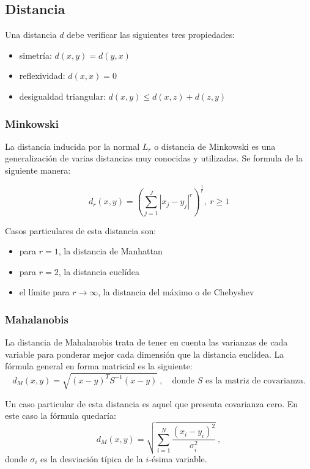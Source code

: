 \documentclass[a4paper,11pt,spanish]{report}
\let\stdsub\subsection
\let\stdsubsub\subsubsection
\renewcommand{\section}{\stdsub}
\renewcommand{\subsection}{\stdsubsub}
\begin{document}
\section{Distancia}
\label{sec-1-2-3}

Una distancia $d$ debe verificar las siguientes tres propiedades:
\begin{itemize}
\item simetría: $d(x,y)=d(y,x)$
\item reflexividad: $d(x,x) = 0$
\item desigualdad triangular: $d(x,y)\leq d(x,z)+d(z,y)$
\end{itemize}

\subsection*{Minkowski}
\label{sec-1-2-3-1}

La distancia inducida por la normal $L_r$ o distancia de Minkowski es una generalización de varias distancias muy conocidas y utilizadas. Se formula de la siguiente manera: 

$$d_r(x,y) = \left(\sum_{j=1}^J |x_j-y_j|^r\right)^{\frac 1 r},~r\geq 1$$

Casos particulares de esta distancia son:
\begin{itemize}
\item para $r=1$, la distancia de Manhattan
\item para $r=2$, la distancia euclídea
\item el límite para $r\rightarrow \infty$, la distancia del máximo o de Chebyshev
\end{itemize}

\subsection*{Mahalanobis}
\label{sec-1-2-3-2}

La distancia de Mahalanobis trata de tener en cuenta las varianzas de cada variable para ponderar mejor cada dimensión que la distancia euclídea. La fórmula general en forma matricial es la siguiente:
$$d_M(x,y)=\sqrt{(x-y)^TS^{-1}(x-y)}~,\quad\mbox{donde }S\mbox{ es la matriz de covarianza.}$$

Un caso particular de esta distancia es aquel que presenta covarianza cero. En este caso la fórmula quedaría:
$$d_M(x,y)=\sqrt{\sum_{i=1}^N\frac{(x_i-y_i)^2}{\sigma_i^2}}~,$$
donde $\sigma_i$ es la desviación típica de la $i$-ésima variable.
\end{document}
